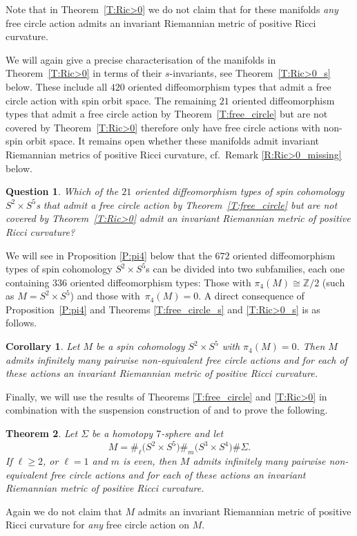 \documentclass[pdftex]{sigma}
\numberwithin{equation}{section}
\newtheorem{theoremAlph}{Theorem}
\newtheorem{corollaryAlph}[theoremAlph]{Corollary}
\newtheorem{Question}[Theorem]{Question}
\theoremstyle{definition}
\numberwithin{table}{section}
\newcommand{\Z}{\mathbb{Z}}
\begin{document}
Note that in Theorem~\ref{T:Ric>0} we do not claim that for these manifolds \emph{any} free circle action admits an invariant Riemannian metric of positive Ricci curvature.

We will again give a precise characterisation of the manifolds in Theorem~\ref{T:Ric>0} in terms of their $s$-invariants, see Theorem~\ref{T:Ric>0_s} below. These include all $420$ oriented diffeomorphism types that admit a free circle action with spin orbit space. The remaining $21$ oriented diffeomorphism types that admit a free circle action by Theorem~\ref{T:free_circle} but are not covered by Theorem~\ref{T:Ric>0} therefore only have free circle actions with non-spin orbit space. It remains open whether these manifolds admit invariant Riemannian metrics of positive Ricci curvature, cf.\ Remark \ref{R:Ric>0_missing} below.
\begin{Question}\label{Q:Ric>0_missing}
	Which of the $21$ oriented diffeomorphism types of spin cohomology $S^2\times S^5$s that admit a free circle action by Theorem~\ref{T:free_circle} but are not covered by Theorem~\ref{T:Ric>0} admit an invariant Riemannian metric of positive Ricci curvature?
\end{Question}

We will see in Proposition \ref{P:pi4} below that the $672$ oriented diffeomorphism types of spin cohomology $S^2\times S^5$s can be divided into two subfamilies, each one containing $336$ oriented diffeomorphism types: Those with $\pi_4(M)\cong\Z/2$ \big(such as $M=S^2\times S^5$\big) and those with~${\pi_4(M)=0}$. A direct consequence of Proposition~\ref{P:pi4} and Theorems \ref{T:free_circle_s} and \ref{T:Ric>0_s} is as follows.
\begin{corollaryAlph}
	Let $M$ be a spin cohomology $S^2\times S^5$ with $\pi_4(M)=0$. Then $M$ admits infinitely many pairwise non-equivalent free circle actions and for each of these actions an invariant Riemannian metric of positive Ricci curvature.
\end{corollaryAlph}

Finally, we will use the results of Theorems \ref{T:free_circle} and \ref{T:Ric>0} in combination with the suspension construction of \cite{Du26} and \cite{GR25} to prove the following.
\begin{theoremAlph}\label{T:conn_sums}
	Let $\Sigma$ be a homotopy $7$-sphere and let
	\[ M=\#_\ell\bigl(S^2\times S^5\bigr)\#_m\bigl(S^3\times S^4\bigr)\#\Sigma. \]
	If $\ell\geq 2$, or $\ell=1$ and $m$ is even, then $M$ admits infinitely many pairwise non-equivalent free circle actions and for each of these actions an invariant Riemannian metric of positive Ricci curvature.
\end{theoremAlph}
Again we do not claim that $M$ admits an invariant Riemannian metric of positive Ricci curvature for \emph{any} free circle action on $M$.
\end{document}
